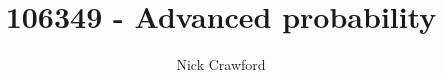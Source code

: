 \documentclass[]{article}
\title{106349 - Advanced probability}
\author{Nick Crawford}
\begin{document}
\maketitle

\begin{abstract}

\end{abstract}


\end{document}
